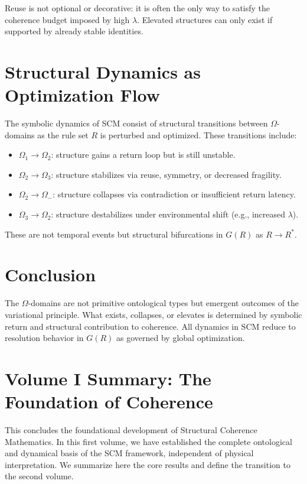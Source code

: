 \noindent
Reuse is not optional or decorative: it is often the only way to satisfy the coherence budget imposed by high $\lambda$. Elevated structures can only exist if supported by already stable identities.

\section{Structural Dynamics as Optimization Flow}

The symbolic dynamics of SCM consist of structural transitions between $\Omega$-domains as the rule set $R$ is perturbed and optimized. These transitions include:

\begin{itemize}
    \item $\Omega_1 \to \Omega_2$: structure gains a return loop but is still unstable.
    \item $\Omega_2 \to \Omega_3$: structure stabilizes via reuse, symmetry, or decreased fragility.
    \item $\Omega_2 \to \Omega_-$: structure collapses via contradiction or insufficient return latency.
    \item $\Omega_3 \to \Omega_2$: structure destabilizes under environmental shift (e.g., increased $\lambda$).
\end{itemize}

These are not temporal events but structural bifurcations in $G(R)$ as $R \to R^*$.

\section{Conclusion}

The $\Omega$-domains are not primitive ontological types but emergent outcomes of the variational principle. What exists, collapses, or elevates is determined by symbolic return and structural contribution to coherence. All dynamics in SCM reduce to resolution behavior in $G(R)$ as governed by global optimization.

\section{Volume I Summary: The Foundation of Coherence}

This concludes the foundational development of Structural Coherence Mathematics. In this first volume, we have established the complete ontological and dynamical basis of the SCM framework, independent of physical interpretation. We summarize here the core results and define the transition to the second volume.

